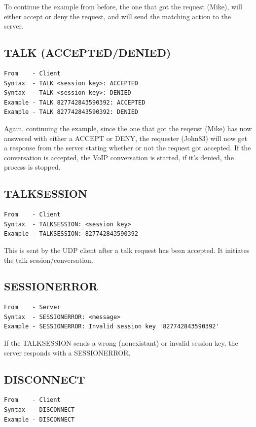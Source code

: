 \documentclass[12pt]{rapport}
\begin{document}
\noindent To continue the example from before, the one that got the
request (Mike), will either accept or deny the request, and will send
the matching action to the server.

\subsection*{TALK (ACCEPTED/DENIED)}
\begin{verbatim}
From    - Client
Syntax  - TALK <session key>: ACCEPTED
Syntax  - TALK <session key>: DENIED
Example - TALK 827742843590392: ACCEPTED
Example - TALK 827742843590392: DENIED
\end{verbatim}

\noindent Again, continuing the example, since the one that got the
reqeust (Mike) has now answered with either a ACCEPT or DENY, the
requester (John83) will now get a response from the server stating
whether or not the request got accepted. If the conversation is
accepted, the VoIP conversation is started, if it's denied, the
process is stopped.

\subsection*{TALKSESSION}
\begin{verbatim}
From    - Client
Syntax  - TALKSESSION: <session key>
Example - TALKSESSION: 827742843590392
\end{verbatim}

\noindent This is sent by the UDP client after a talk request has been
accepted. It initiates the talk session/conversation.

\subsection*{SESSIONERROR}
\begin{verbatim}
From    - Server
Syntax  - SESSIONERROR: <message>
Example - SESSIONERROR: Invalid session key '827742843590392'
\end{verbatim}

\noindent If the TALKSESSION sends a wrong (nonexistant) or invalid
session key, the server responds with a SESSIONERROR.

\subsection*{DISCONNECT}
\begin{verbatim}
From    - Client
Syntax  - DISCONNECT
Example - DISCONNECT
\end{verbatim}
\end{document}
